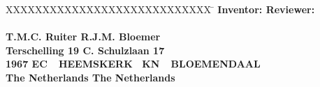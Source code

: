 \begin{tabbing}
XXXXXXXXXXXXXXXXXXXXXXXXXXXX \= \kill
\bfseries Inventor: \> \bfseries Reviewer: \\
\\
T.M.C. Ruiter \> R.J.M. Bloemer\\
Terschelling 19 \> C. Schulzlaan 17\\
1967 EC\ \ HEEMSKERK \ KN\ \ BLOEMENDAAL\\
The Netherlands \> The Netherlands\\
\end{tabbing}

